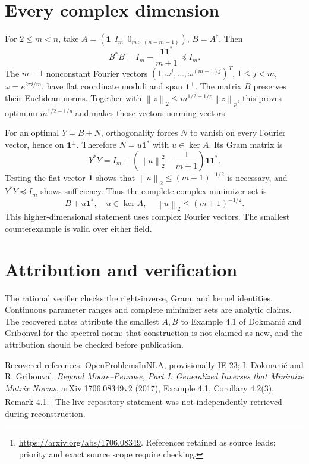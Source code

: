 \documentclass[11pt]{article}
\newcommand{\norm}[1]{\left\lVert#1\right\rVert}
\newcommand{\one}{\boldsymbol 1}
\begin{document}
\section{Every complex dimension}
For $2\le m<n$, take $A=(\one\ \ I_m\ \ 0_{m\times(n-m-1)})$, $B=A^\dagger$. Then
\[B^*B=I_m-\frac{\one\one^*}{m+1}\preceq I_m.\]
The $m-1$ nonconstant Fourier vectors $(1,\omega^j,\ldots,\omega^{(m-1)j})^T$, $1\le j<m$, $\omega=e^{2\pi i/m}$, have flat coordinate moduli and span $\one^\perp$. The matrix $B$ preserves their Euclidean norms. Together with $\norm z_2\le m^{1/2-1/p}\norm z_p$, this proves optimum $m^{1/2-1/p}$ and makes those vectors norming vectors.

For an optimal $Y=B+N$, orthogonality forces $N$ to vanish on every Fourier vector, hence on $\one^\perp$. Therefore $N=u\one^*$ with $u\in\ker A$. Its Gram matrix is
\[Y^*Y=I_m+\left(\norm u_2^2-\frac1{m+1}\right)\one\one^*.\]
Testing the flat vector $\one$ shows that $\norm u_2\le(m+1)^{-1/2}$ is necessary, and $Y^*Y\preceq I_m$ shows sufficiency. Thus the complete complex minimizer set is
\[\boxed{B+u\one^*,\quad u\in\ker A,\quad \norm u_2\le(m+1)^{-1/2}.}\]
This higher-dimensional statement uses complex Fourier vectors. The smallest counterexample is valid over either field.
\section{Attribution and verification}
The rational verifier checks the right-inverse, Gram, and kernel identities. Continuous parameter ranges and complete minimizer sets are analytic claims. The recovered notes attribute the smallest $A,B$ to Example 4.1 of Dokmani\'c and Gribonval for the spectral norm; that construction is not claimed as new, and the attribution should be checked before publication.

Recovered references: OpenProblemsInNLA, provisionally IE-23; I. Dokmani\'c and R. Gribonval, \emph{Beyond Moore--Penrose, Part I: Generalized Inverses that Minimize Matrix Norms}, arXiv:1706.08349v2 (2017), Example 4.1, Corollary 4.2(3), Remark 4.1.\footnote{\url{https://arxiv.org/abs/1706.08349}. References retained as source leads; priority and exact source scope require checking.} The live repository statement was not independently retrieved during reconstruction.
\end{document}
